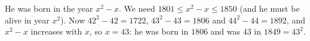 He was born in the year $x^2-x$. We need $1801\le x^2-x\le1850$ (and he must be alive in year $x^2$). Now $42^2-42=1722$, $43^2-43=1806$ and $44^2-44=1892$, and $x^2-x$ increases with $x$, so $x=43$: he was born in $\boxed{1806}$ and was $43$ in $1849=43^2$.
